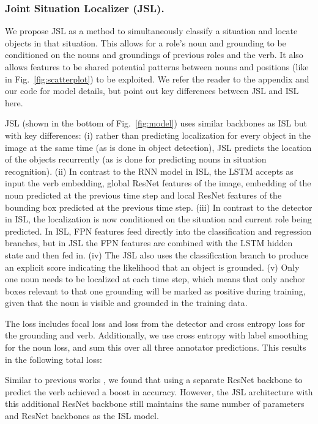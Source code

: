 \documentclass[runningheads]{llncs}
\begin{document}
\subsubsection{Joint Situation Localizer (JSL). }
We propose JSL as a method to simultaneously classify a situation and locate objects in that situation. This allows for a role's noun and grounding to be conditioned on the nouns and groundings of previous roles and the verb. It also allows features to be shared potential patterns between nouns and positions (like in Fig.~\ref{fig:scatterplot}) to be exploited. We refer the reader to the appendix and our code for model details, but point out key differences between JSL and ISL here. 

JSL (shown in the bottom of Fig.~\ref{fig:model}) uses similar backbones as ISL but with key differences: (i) rather than predicting localization for every object in the image at the same time (as is done in object detection), JSL predicts the location of the objects recurrently (as is done for predicting nouns in situation recognition). (ii) In contrast to the RNN model in ISL, the LSTM accepts as input the verb embedding, global ResNet features of the image, embedding of the noun predicted at the previous time step and local ResNet features of the bounding box predicted at the previous time step. (iii) In contrast to the detector in ISL, the localization is now conditioned on the situation and current role being predicted. In ISL, FPN features feed directly into the classification and regression branches, but in JSL the FPN features are combined with the LSTM hidden state and then fed in. (iv) The JSL also uses the classification branch to produce an explicit score indicating the likelihood that an object is grounded. (v) Only one noun needs to be localized at each time step, which means that only anchor boxes relevant to that one grounding will be marked as positive during training, given that the noun is visible and grounded in the training data. 


The loss includes focal loss and  loss from the detector and cross entropy loss for the grounding and verb. Additionally, we use cross entropy with label smoothing for the noun loss, and sum this over all three annotator predictions. This results in the following total loss:


Similar to previous works \cite{imsiturnn,suhail2019mixture}, we found that using a separate ResNet backbone to predict the verb achieved a boost in accuracy. However, the JSL architecture with this additional ResNet backbone still maintains the same number of parameters and ResNet backbones as the ISL model.
\end{document}
